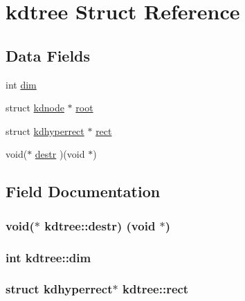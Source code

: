 \hypertarget{structkdtree}{}\section{kdtree Struct Reference}
\label{structkdtree}
\subsection*{Data Fields}
\begin{DoxyCompactItemize}
\item 
int \hyperlink{structkdtree_a50a985e0d8433bdc599078663b618a83}{dim}
\item 
struct \hyperlink{structkdnode}{kdnode} $\ast$ \hyperlink{structkdtree_accef3227abac75a5eed239590ce574d9}{root}
\item 
struct \hyperlink{structkdhyperrect}{kdhyperrect} $\ast$ \hyperlink{structkdtree_aad2df600bbe8cf682fe61ac6847f5e18}{rect}
\item 
void($\ast$ \hyperlink{structkdtree_a889824b2252bbda54955bf245974265b}{destr} )(void $\ast$)
\end{DoxyCompactItemize}


\subsection{Field Documentation}
\hypertarget{structkdtree_a889824b2252bbda54955bf245974265b}{}
\subsubsection[{destr}]{\setlength{\rightskip}{0pt plus 5cm}void($\ast$ kdtree\+::destr) (void $\ast$)}\label{structkdtree_a889824b2252bbda54955bf245974265b}
\hypertarget{structkdtree_a50a985e0d8433bdc599078663b618a83}{}
\subsubsection[{dim}]{\setlength{\rightskip}{0pt plus 5cm}int kdtree\+::dim}\label{structkdtree_a50a985e0d8433bdc599078663b618a83}
\hypertarget{structkdtree_aad2df600bbe8cf682fe61ac6847f5e18}{}
\subsubsection[{rect}]{\setlength{\rightskip}{0pt plus 5cm}struct {\bf kdhyperrect}$\ast$ kdtree\+::rect}\label{structkdtree_aad2df600bbe8cf682fe61ac6847f5e18}
\hypertarget{structkdtree_accef3227abac75a5eed239590ce574d9}{}
